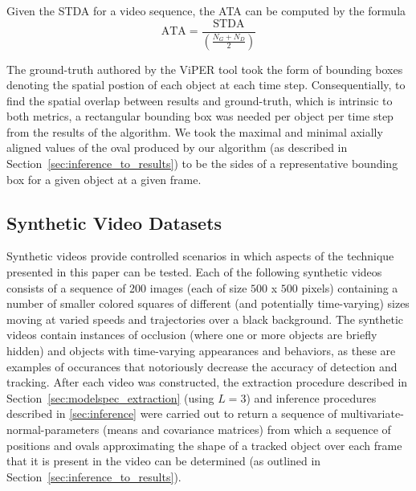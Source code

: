 \documentclass[smallcondensed, final]{svjour3}
\begin{document}
Given the STDA for a video sequence, the ATA can be computed by the formula
\begin{equation}
\text{ATA} = \frac{\text{STDA}}{\left( \frac{N_{G} + N_{D}}{2} \right)}
\end{equation}

The ground-truth authored by the ViPER tool took the form of bounding boxes denoting the spatial postion of each object at each time step. Consequentially, to find the spatial overlap between results and ground-truth, which is intrinsic to both metrics, a rectangular bounding box was needed per object per time step from the results of the algorithm. We took the maximal and minimal axially aligned values of the oval produced by our algorithm (as described in Section~\ref{sec:inference_to_results}) to be the sides of a representative bounding box for a given object at a given frame.

\subsection{Synthetic Video Datasets}
\label{sec:syntheticvideos}

Synthetic videos provide controlled scenarios in which aspects of the technique presented in this paper can be tested. Each of the following synthetic videos consists of a sequence of 200 images (each of size $500$ x $500$ pixels) containing a number of smaller colored squares of different (and potentially time-varying) sizes moving at varied speeds and trajectories over a black background. The synthetic videos contain instances of occlusion (where one or more objects are briefly hidden) and objects with time-varying appearances and behaviors, as these are examples of occurances that notoriously decrease the accuracy of detection and tracking. After each video was constructed, the extraction procedure described in Section~\ref{sec:modelspec_extraction} (using $L=3$) and inference procedures described in \ref{sec:inference} were carried out to return a sequence of multivariate-normal-parameters (means and covariance matrices) from which a sequence of positions and ovals approximating the shape of a tracked object over each frame that it is present in the video can be determined (as outlined in Section~\ref{sec:inference_to_results}).


\end{document}
